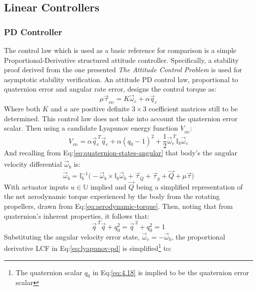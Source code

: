 \subsection{Linear Controllers}
\label{subsec:control.attitude.controllers}
\subsubsection{PD Controller}
\label{subsubsec:control.attitude.controllers.pd}
The control law which is used as a basic reference for comparison is a simple Proportional-Derivative structured attitude controller. Specifically, a stability proof derived from the one presented \emph{The Attitude Control Problem}\cite{attitudecontrolproblem} is used for asymptotic stability verification. An attitude PD control law, proportional to quaternion error and angular rate error, designs the control torque as:
\begin{equation}\label{eq:independent-pd}
\mu\vec{\tau}_{_{PD}}=K\vec{\omega}_e+\alpha\vec{q}_e
\end{equation}
Where both $K$ and $a$ are positive definite $3\times 3$ coefficient matrices still to be determined. This control law does not take into account the quaternion error scalar. Then using a candidate Lyapunov energy function $V_{_{PD}}$:
\begin{equation}\label{eq:lyapunov-pd}
V_{_{PD}}=\alpha\vec{q}_e^{~T}\vec{q}_e+\alpha(q_0-1)^2+\frac{1}{2}\vec{\omega}_e^{~T}\mathbb{I}_b\vec{\omega}_e
\end{equation}
And recalling from Eq:\ref{eq:quaternion-states-angular} that body's the angular velocity differential $\dot{\vec{\omega}}_b$ is:
\begin{equation}
\dot{\vec{\omega}}_b=\mathbb{I}_b^{-1}\big(-\vec{\omega}_b\times\mathbb{I}_b\vec{\omega}_b+\vec{\tau}_Q+\vec{\tau}_g+\vec{Q}+\mu\vec{\tau}\big)
\end{equation}
With actuator inputs $u\in\mathbb{U}$ implied and $\vec{Q}$ being a simplified representation of the net aerodynamic torque experienced by the body from the rotating propellers, drawn from Eq:\ref{eq:aerodynamic-torque}. Then, noting that from quaternion's inherent properties, it follows that:
\begin{equation}\label{eq:4.17}
\vec{q}^{~T}\vec{q}+q_0^2=\vec{q}^{~2}+q_0^2=1
\end{equation}
Substituting the angular velocity error state, $\vec{\omega}_e=-\vec{\omega}_b$, the proportional derivative LCF in Eq:\ref{eq:lyapunov-pd} is simplified\footnote{The quaternion scalar $q_0$ in Eq:\ref{eq:4.18} is implied to be the quaternion error scalar} to:
